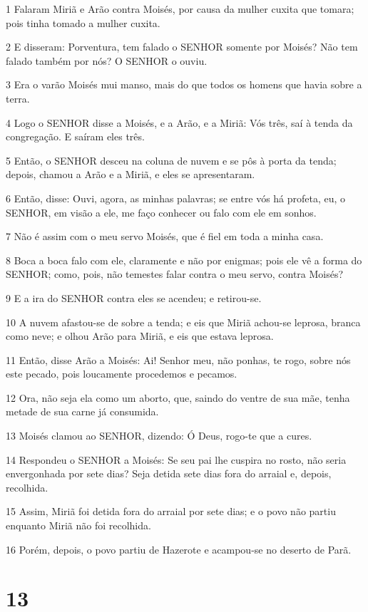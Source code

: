 \par 1 Falaram Miriã e Arão contra Moisés, por causa da mulher cuxita que tomara; pois tinha tomado a mulher cuxita.
\par 2 E disseram: Porventura, tem falado o SENHOR somente por Moisés? Não tem falado também por nós? O SENHOR o ouviu.
\par 3 Era o varão Moisés mui manso, mais do que todos os homens que havia sobre a terra.
\par 4 Logo o SENHOR disse a Moisés, e a Arão, e a Miriã: Vós três, saí à tenda da congregação. E saíram eles três.
\par 5 Então, o SENHOR desceu na coluna de nuvem e se pôs à porta da tenda; depois, chamou a Arão e a Miriã, e eles se apresentaram.
\par 6 Então, disse: Ouvi, agora, as minhas palavras; se entre vós há profeta, eu, o SENHOR, em visão a ele, me faço conhecer ou falo com ele em sonhos.
\par 7 Não é assim com o meu servo Moisés, que é fiel em toda a minha casa.
\par 8 Boca a boca falo com ele, claramente e não por enigmas; pois ele vê a forma do SENHOR; como, pois, não temestes falar contra o meu servo, contra Moisés?
\par 9 E a ira do SENHOR contra eles se acendeu; e retirou-se.
\par 10 A nuvem afastou-se de sobre a tenda; e eis que Miriã achou-se leprosa, branca como neve; e olhou Arão para Miriã, e eis que estava leprosa.
\par 11 Então, disse Arão a Moisés: Ai! Senhor meu, não ponhas, te rogo, sobre nós este pecado, pois loucamente procedemos e pecamos.
\par 12 Ora, não seja ela como um aborto, que, saindo do ventre de sua mãe, tenha metade de sua carne já consumida.
\par 13 Moisés clamou ao SENHOR, dizendo: Ó Deus, rogo-te que a cures.
\par 14 Respondeu o SENHOR a Moisés: Se seu pai lhe cuspira no rosto, não seria envergonhada por sete dias? Seja detida sete dias fora do arraial e, depois, recolhida.
\par 15 Assim, Miriã foi detida fora do arraial por sete dias; e o povo não partiu enquanto Miriã não foi recolhida.
\par 16 Porém, depois, o povo partiu de Hazerote e acampou-se no deserto de Parã.

\chapter{13}


